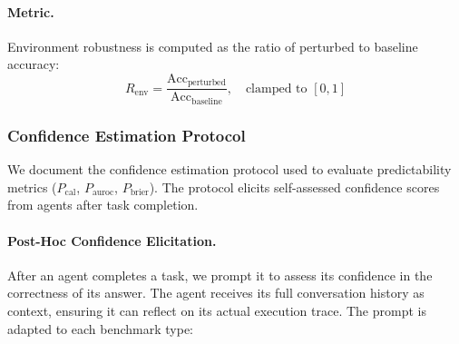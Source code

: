 \documentclass[11pt]{article}
\begin{document}
\paragraph{Metric.}

Environment robustness is computed as the ratio of perturbed to baseline accuracy:
\begin{equation*}
    R_{\text{env}} = \frac{\text{Acc}_{\text{perturbed}}}{\text{Acc}_{\text{baseline}}}, \quad \text{clamped to } [0, 1]
\end{equation*}

\subsubsection{Confidence Estimation Protocol}
\label{appendix:confidence_estimation}

We document the confidence estimation protocol used to evaluate predictability metrics ($P_{\text{cal}}$, $P_{\text{auroc}}$, $P_{\text{brier}}$). The protocol elicits self-assessed confidence scores from agents after task completion.

\paragraph{Post-Hoc Confidence Elicitation.}

After an agent completes a task, we prompt it to assess its confidence in the correctness of its answer. The agent receives its full conversation history as context, ensuring it can reflect on its actual execution trace. The prompt is adapted to each benchmark type:
\end{document}
